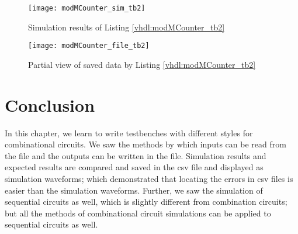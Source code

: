 \begin{figure}[!h]
	\centering
	\texttt{[image: modMCounter\_sim\_tb2]}
	\caption{Simulation results of Listing \ref{vhdl:modMCounter_tb2}}
	\label{fig:modMCounter_sim_tb2}
\end{figure}

\begin{figure}[!h]
	\centering
	\texttt{[image: modMCounter\_file\_tb2]}
	\caption{Partial view of saved data by Listing \ref{vhdl:modMCounter_tb2}}
	\label{fig:modMCounter_file_tb2}
\end{figure}




\section{Conclusion}
In this chapter, we learn to write testbenches with different styles for combinational circuits. We saw the methods by which inputs can be read from the file and the outputs can be written in the file. Simulation results and expected results are compared and saved in the csv file and displayed as simulation waveforms; which demonstrated that locating the errors in csv files is easier than the simulation waveforms. Further, we saw the simulation of sequential circuits as well, which is slightly different from combination circuits; but all the methods of combinational circuit simulations can be applied to sequential circuits as well. 